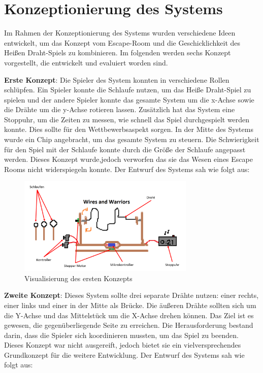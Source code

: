 \chapter{Konzeptionierung des Systems}

Im Rahmen der Konzeptionierung des Systems wurden verschiedene Ideen entwickelt, um das Konzept vom Escape-Room und die Geschicklichkeit des Heißen Draht-Spiels zu kombinieren. Im folgenden werden sechs Konzept vorgestellt, die entwickelt und evaluiert worden sind.

\textbf{Erste Konzept}: Die Spieler des System konnten in verschiedene Rollen schlüpfen. Ein Spieler konnte die Schlaufe nutzen, um das Heiße Draht-Spiel zu spielen und der andere Spieler konnte das gesamte System um die x-Achse sowie die Drähte um die y-Achse rotieren lassen. Zusätzlich hat das System eine Stoppuhr, um die Zeiten zu messen, wie schnell das Spiel durchgespielt werden konnte. Dies sollte für den Wettbewerbsaspekt sorgen. In der Mitte des Systems wurde ein Chip angebracht, um das gesamte System zu steuern. Die Schwierigkeit für den Spiel mit der Schlaufe konnte durch die Größe der Schlaufe angepasst werden. Dieses Konzept wurde,jedoch verworfen das sie das Wesen eines Escape Rooms nicht widerspiegeln konnte. Der Entwurf des Systems sah wie folgt aus: 


\begin{figure}[H]
 \centerline{\includegraphics[width=0.75\textwidth,scale=1]{./images/Konzeptpapier_1.png}}
 \caption{Visualisierung des ersten Konzepts}\label{imageLabel}
\end{figure}  

\textbf{Zweite Konzept}: Dieses System sollte drei separate Drähte nutzen: einer rechts, einer links und einer in der Mitte als Brücke. Die äußeren Drähte sollten sich um die Y-Achse und das Mittelstück um die X-Achse drehen können. Das Ziel ist es gewesen, die gegenüberliegende Seite zu erreichen. Die Herausforderung bestand darin, dass die Spieler sich koordinieren mussten, um das Spiel zu beenden. Dieses Konzept war nicht ausgereift, jedoch bietet sie ein vielversprechendes Grundkonzept für die weitere Entwicklung. Der Entwurf des Systems sah wie folgt aus:

